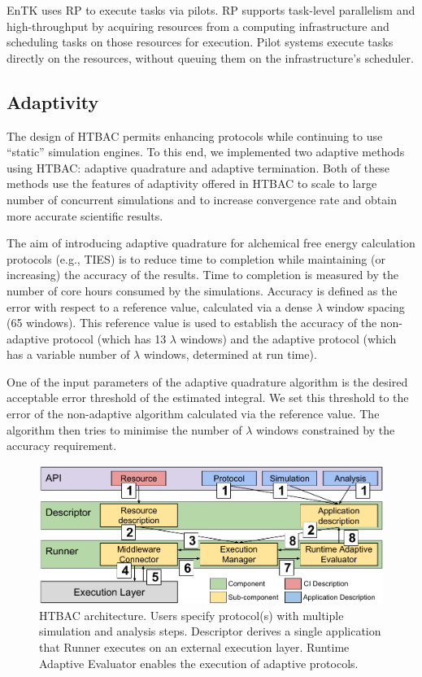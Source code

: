 EnTK uses RP to execute tasks via pilots. RP supports task-level parallelism
and high-throughput by acquiring resources from a computing infrastructure
and scheduling tasks on those resources for execution. Pilot systems execute
tasks directly on the resources, without queuing them on the infrastructure's
scheduler.

\subsection{Adaptivity}

The design of HTBAC permits enhancing protocols while continuing to use
``static'' simulation engines. To this end, we implemented two adaptive
methods using HTBAC: adaptive quadrature and adaptive termination. Both of
these methods use the features of adaptivity offered in HTBAC to scale to
large number of concurrent simulations and to increase convergence rate and
obtain more accurate scientific results.

The aim of introducing adaptive quadrature for alchemical free energy
calculation protocols (e.g., TIES) is to reduce time to completion while
maintaining (or increasing) the accuracy of the results. Time to completion
is measured by the number of core hours consumed by the simulations. Accuracy
is defined as the error with respect to a reference value, calculated via a
dense $\lambda$ window spacing (65 windows). This reference value is used to
establish the accuracy of the non-adaptive protocol (which has 13 $\lambda$
windows) and the adaptive protocol (which has a variable number of $\lambda$
windows, determined at run time).

One of the input parameters of the adaptive quadrature algorithm is the
desired acceptable error threshold of the estimated integral. We set this
threshold to the error of the non-adaptive algorithm calculated via the
reference value. The algorithm then tries to minimise the number of $\lambda$
windows constrained by the accuracy requirement.

\begin{figure}
  \includegraphics[width=\columnwidth]{HTBAC_architecture_model}
  \caption{HTBAC architecture. Users specify protocol(s) with multiple simulation and analysis steps. Descriptor derives a single application that Runner executes on an external execution layer. Runtime Adaptive Evaluator enables the execution of adaptive protocols.}
  \label{fig:htbac}
\end{figure}